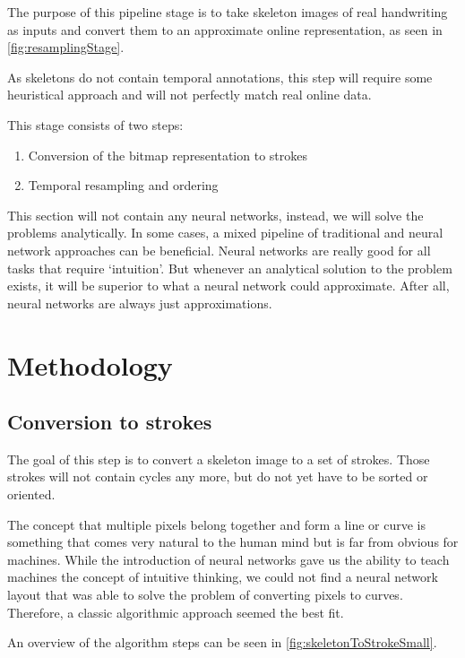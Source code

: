 The purpose of this pipeline stage is to take skeleton images of real handwriting as inputs and convert them to an approximate online representation, as seen in \cref{fig:resamplingStage}.

As skeletons do not contain temporal annotations, this step will require some heuristical approach and will not perfectly match real online data.

This stage consists of two steps:

\begin{enumerate}
\item Conversion of the bitmap representation to strokes
\item Temporal resampling and ordering
\end{enumerate}

This section will not contain any neural networks, instead, we will solve the problems analytically. In some cases, a mixed pipeline of traditional and neural network approaches can be beneficial. Neural networks are really good for all tasks that require `intuition'. But whenever an analytical solution to the problem exists, it will be superior to what a neural network could approximate. After all, neural networks are always just approximations.

\section{Methodology}

\subsection{Conversion to strokes}\label{subsection:conversionToStrokes}
The goal of this step is to convert a skeleton image to a set of strokes. Those strokes will not contain cycles any more, but do not yet have to be sorted or oriented.

The concept that multiple pixels belong together and form a line or curve is something that comes very natural to the human mind but is far from obvious for machines. While the introduction of neural networks gave us the ability to teach machines the concept of intuitive thinking, we could not find a neural network layout that was able to solve the problem of converting pixels to curves. Therefore, a classic algorithmic approach seemed the best fit.

An overview of the algorithm steps can be seen in \cref{fig:skeletonToStrokeSmall}.


